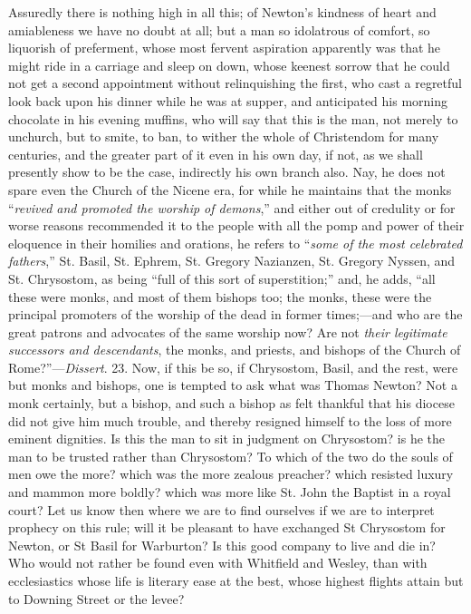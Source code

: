 Assuredly there is nothing high in all this; of Newton's kindness
of heart and amiableness we have no doubt at all; but a man so
idolatrous of comfort, so liquorish of preferment, whose most fervent
aspiration apparently was that he might ride in a carriage and sleep
on down, whose keenest sorrow that he could not get a second
appointment without relinquishing the first, who cast a regretful
look back upon his dinner while he was at supper, and
anticipated his morning chocolate in his evening muffins, who will say
that this is the man, not merely to unchurch, but to smite, to ban, to
wither the whole of Christendom for many centuries, and the greater
part of it even in his own day, if not, as we shall presently show to
be the case, indirectly his own branch also. Nay, he does not spare
even the Church of the Nicene era, for while he maintains that the
monks ``\emph{revived and promoted the worship of demons},''
and either out of credulity or for worse reasons recommended it to the
people with all the pomp and power of their eloquence in their
homilies and orations, he refers to ``\emph{some of the most
celebrated fathers},'' St. Basil, St. Ephrem, St. Gregory
Nazianzen, St. Gregory Nyssen, and St. Chrysostom, as being ``full
of this sort of superstition;'' and, he adds, ``all these were
monks, and most of them bishops too; the monks, these were the
principal promoters of the worship of the dead in former times;—and
who are the great patrons and advocates of the same worship now? Are
not \emph{their legitimate successors and descendants}, the monks, and
priests, and bishops of the Church of Rome?''—\emph{Dissert}.
23. Now, if this be so, if Chrysostom, Basil, and the rest, were but
monks and bishops, one is tempted to ask what was Thomas Newton? Not a
monk certainly, but a bishop, and such a bishop as felt thankful that
his diocese did not give him much trouble, and thereby resigned
himself to the loss of more eminent dignities. Is this the man to sit
in judgment on Chrysostom? is he the man to be trusted rather than
Chrysostom? To which of the two do the souls of men owe the more?
which was the more zealous preacher? which resisted luxury and mammon
more boldly? which was more like St. John the Baptist in a royal
court? Let us know then where we are to find ourselves if we are
to interpret prophecy on this rule; will it be pleasant to have
exchanged St Chrysostom for Newton, or St Basil for Warburton? Is this
good company to live and die in? Who would not rather be found even
with Whitfield and Wesley, than with ecclesiastics whose life is
literary ease at the best, whose highest flights attain but to Downing
Street or the levee?


